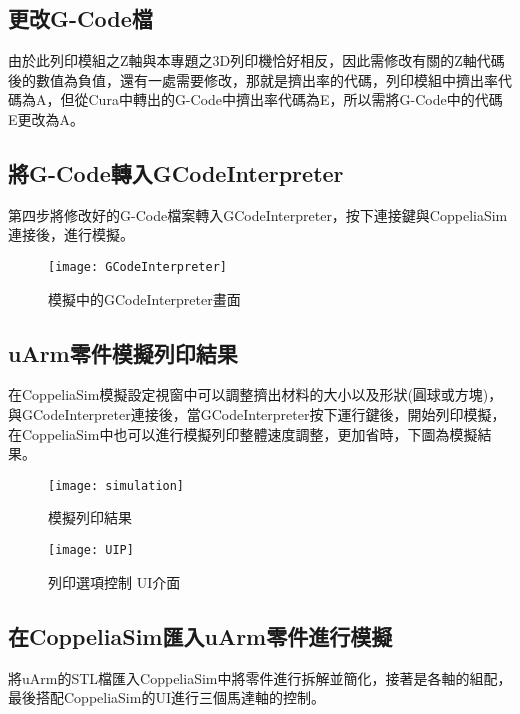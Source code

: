 \subsection{更改G-Code檔}
 由於此列印模組之Z軸與本專題之3D列印機恰好相反，因此需修改有關的Z軸代碼後的數值為負值，還有一處需要修改，那就是擠出率的代碼，列印模組中擠出率代碼為A，但從Cura中轉出的G-Code中擠出率代碼為E，所以需將G-Code中的代碼E更改為A。\\
\newpage

\subsection{將G-Code轉入GCodeInterpreter}
 第四步將修改好的G-Code檔案轉入GCodeInterpreter，按下連接鍵與CoppeliaSim連接後，進行模擬。\\
\begin{figure}[htb]
\begin{center}
\texttt{[image: GCodeInterpreter]}
\caption{\Large 模擬中的GCodeInterpreter畫面}\label{GCodeInterpreter}
\end{center}
\end{figure}

\subsection{uArm零件模擬列印結果}
 在CoppeliaSim模擬設定視窗中可以調整擠出材料的大小以及形狀(圓球或方塊)，與GCodeInterpreter連接後，當GCodeInterpreter按下運行鍵後，開始列印模擬，在CoppeliaSim中也可以進行模擬列印整體速度調整，更加省時，下圖為模擬結果。\\
\begin{figure}[htb]
\begin{center}
\texttt{[image: simulation]}
\caption{\Large 模擬列印結果}\label{simulation}
\end{center}
\end{figure}

\begin{figure}[htb]
\begin{center}
\texttt{[image: UIP]}
\caption{\Large 列印選項控制 UI介面}\label{UIP}
\end{center}
\end{figure}

\subsection{在CoppeliaSim匯入uArm零件進行模擬}
 將uArm的STL檔匯入CoppeliaSim中將零件進行拆解並簡化，接著是各軸的組配，最後搭配CoppeliaSim的UI進行三個馬達軸的控制。\\


